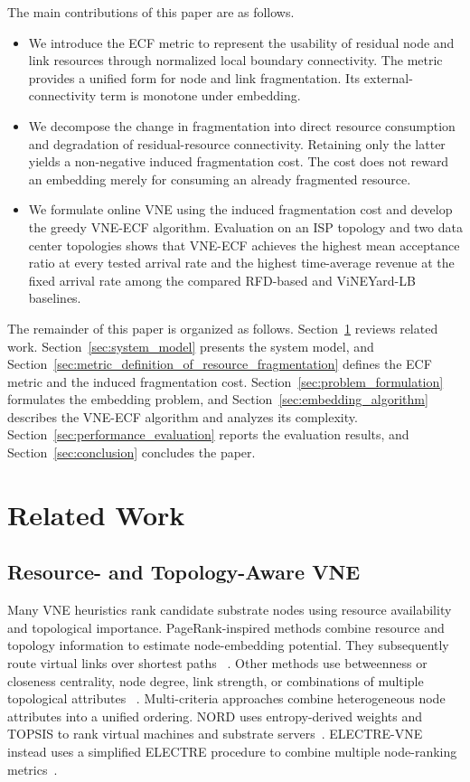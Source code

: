 \documentclass{ieeeaccess}
\newcommand{\ecf}{ECF}
\newcommand{\ecfvne}{VNE-ECF}
\begin{document}
The main contributions of this paper are as follows.
\begin{itemize}
	\item We introduce the \ecf{} metric to represent the usability of residual node and link
	resources through normalized local boundary connectivity. The metric provides a unified form for
	node and link fragmentation. Its external-connectivity term is monotone under embedding.

	\item We decompose the change in fragmentation into direct resource consumption and degradation
	of residual-resource connectivity. Retaining only the latter yields a non-negative induced
	fragmentation cost. The cost does not reward an embedding merely for consuming an already
	fragmented resource.

	\item We formulate online VNE using the induced fragmentation cost and develop the greedy
	\ecfvne{} algorithm. Evaluation on an ISP topology and two data center topologies shows that
	\ecfvne{} achieves the highest mean acceptance ratio at every tested arrival rate and the highest
	time-average revenue at the fixed arrival rate among the compared RFD-based and ViNEYard-LB
	baselines.
\end{itemize}

The remainder of this paper is organized as follows. Section~\ref{sec:related_work} reviews related
work. Section~\ref{sec:system_model} presents the system model, and
Section~\ref{sec:metric_definition_of_resource_fragmentation} defines the \ecf{} metric and the
induced fragmentation cost. Section~\ref{sec:problem_formulation} formulates the embedding problem,
and Section~\ref{sec:embedding_algorithm} describes the \ecfvne{} algorithm and analyzes its
complexity. Section~\ref{sec:performance_evaluation} reports the evaluation results, and
Section~\ref{sec:conclusion} concludes the paper.

\section{Related Work}
\label{sec:related_work}

\subsection{Resource- and Topology-Aware VNE}

Many VNE heuristics rank candidate substrate nodes using resource availability and topological
importance. PageRank-inspired methods combine resource and topology information to estimate
node-embedding potential. They subsequently route virtual links over shortest paths
~\cite{cao2017novel,hashmi2020vne}. Other methods use betweenness or closeness centrality, node
degree, link strength, or combinations of multiple topological attributes
~\cite{ding2015virtual,guler2016closeness,feng2014topology}. Multi-criteria approaches combine
heterogeneous node attributes into a unified ordering. NORD uses entropy-derived weights and
TOPSIS to rank virtual machines and substrate servers~\cite{tg2023nord}. ELECTRE-VNE instead uses a
simplified ELECTRE procedure to combine multiple node-ranking metrics~\cite{zhang2018virtual}.
\end{document}
